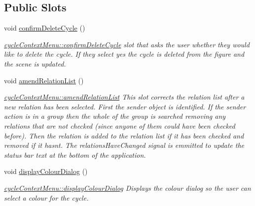 \subsection*{Public Slots}
\begin{DoxyCompactItemize}
\item 
\mbox{\label{classcycle_context_menu_a844d59a74d643b19fd19eb1de11ea4e9}} 
void \mbox{\hyperlink{classcycle_context_menu_a844d59a74d643b19fd19eb1de11ea4e9}{confirm\+Delete\+Cycle}} ()
\begin{DoxyCompactList}\small\item\em \mbox{\hyperlink{classcycle_context_menu_a844d59a74d643b19fd19eb1de11ea4e9}{cycle\+Context\+Menu\+::confirm\+Delete\+Cycle}} slot that asks the user whether they would like to delete the cycle. If they select yes the cycle is deleted from the figure and the scene is updated. \end{DoxyCompactList}\item 
\mbox{\label{classcycle_context_menu_a6a75f4ba6b3db319468db92fd0948a65}} 
void \mbox{\hyperlink{classcycle_context_menu_a6a75f4ba6b3db319468db92fd0948a65}{amend\+Relation\+List}} ()
\begin{DoxyCompactList}\small\item\em \mbox{\hyperlink{classcycle_context_menu_a6a75f4ba6b3db319468db92fd0948a65}{cycle\+Context\+Menu\+::amend\+Relation\+List}} This slot corrects the relation list after a new relation has been selected. First the sender object is identified. If the sender action is in a group then the whole of the group is searched removing any relations that are not checked (since anyone of them could have been checked before). Then the relation is added to the relation list if it has been checked and removed if it hasn\textquotesingle{}t. The relations\+Have\+Changed signal is emmitted to update the status bar text at the bottom of the application. \end{DoxyCompactList}\item 
\mbox{\label{classcycle_context_menu_abf4f98f97561d5acd104a6c0b2038e15}} 
void \mbox{\hyperlink{classcycle_context_menu_abf4f98f97561d5acd104a6c0b2038e15}{display\+Colour\+Dialog}} ()
\begin{DoxyCompactList}\small\item\em \mbox{\hyperlink{classcycle_context_menu_abf4f98f97561d5acd104a6c0b2038e15}{cycle\+Context\+Menu\+::display\+Colour\+Dialog}} Displays the colour dialog so the user can select a colour for the cycle. \end{DoxyCompactList}\item 

\end{DoxyCompactItemize}
